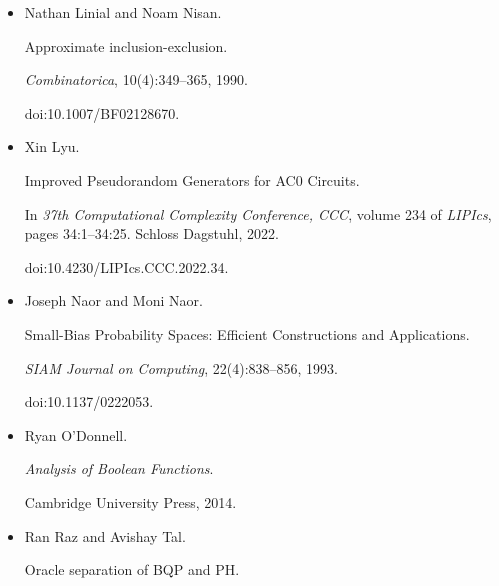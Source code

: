 \begin{itemize}
Johan Håstad, Benjamin Rossman, Rocco Servedio, and Li-Yang Tan.


An Average-Case Depth Hierarchy Theorem for Boolean Circuits.


\emph{Journal of the ACM}, 64(5), 2017.


doi:10.1145/3095799.





\item[] 
[16]

Nathan Linial and Noam Nisan.


Approximate inclusion-exclusion.


\emph{Combinatorica}, 10(4):349–365, 1990.


doi:10.1007/BF02128670.





\item[] 
[17]

Xin Lyu.


Improved Pseudorandom Generators for AC0 Circuits.


In \emph{37th Computational Complexity Conference, CCC}, volume 234
of \emph{LIPIcs}, pages 34:1–34:25. Schloss Dagstuhl, 2022.


doi:10.4230/LIPIcs.CCC.2022.34.





\item[] 
[18]

Joseph Naor and Moni Naor.


Small-Bias Probability Spaces: Efficient Constructions and
Applications.


\emph{SIAM Journal on Computing}, 22(4):838–856, 1993.


doi:10.1137/0222053.





\item[] 
[19]

Ryan O’Donnell.


\emph{Analysis of Boolean Functions}.


Cambridge University Press, 2014.





\item[] 
[20]

Ran Raz and Avishay Tal.


Oracle separation of BQP and PH.



\end{itemize}

